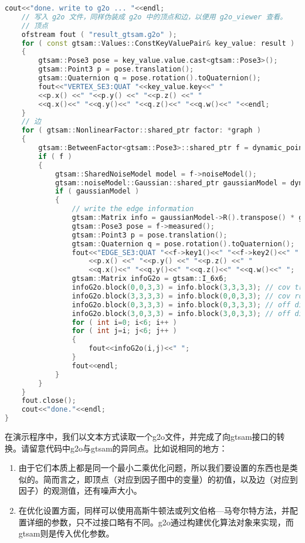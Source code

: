 \begin{lstlisting}[language=c++,caption=slambook/ch11/pose\_graph\_gtsam.cpp]
	cout<<"done. write to g2o ... "<<endl;
	// 写入 g2o 文件，同样伪装成 g2o 中的顶点和边，以便用 g2o_viewer 查看。
	// 顶点
	ofstream fout ( "result_gtsam.g2o" );
	for ( const gtsam::Values::ConstKeyValuePair& key_value: result )
	{
		gtsam::Pose3 pose = key_value.value.cast<gtsam::Pose3>();
		gtsam::Point3 p = pose.translation();
		gtsam::Quaternion q = pose.rotation().toQuaternion();
		fout<<"VERTEX_SE3:QUAT "<<key_value.key<<" "
		<<p.x() <<" "<<p.y() <<" "<<p.z() <<" "
		<<q.x()<<" "<<q.y()<<" "<<q.z()<<" "<<q.w()<<" "<<endl;
	}
	// 边 
	for ( gtsam::NonlinearFactor::shared_ptr factor: *graph )
	{
		gtsam::BetweenFactor<gtsam::Pose3>::shared_ptr f = dynamic_pointer_cast<gtsam::BetweenFactor<gtsam::Pose3>>( factor );
		if ( f )
		{
			gtsam::SharedNoiseModel model = f->noiseModel();
			gtsam::noiseModel::Gaussian::shared_ptr gaussianModel = dynamic_pointer_cast<gtsam::noiseModel::Gaussian>( model );
			if ( gaussianModel )
			{
				// write the edge information 
				gtsam::Matrix info = gaussianModel->R().transpose() * gaussianModel->R();
				gtsam::Pose3 pose = f->measured();
				gtsam::Point3 p = pose.translation();
				gtsam::Quaternion q = pose.rotation().toQuaternion();
				fout<<"EDGE_SE3:QUAT "<<f->key1()<<" "<<f->key2()<<" "
					<<p.x() <<" "<<p.y() <<" "<<p.z() <<" "
					<<q.x()<<" "<<q.y()<<" "<<q.z()<<" "<<q.w()<<" ";
				gtsam::Matrix infoG2o = gtsam::I_6x6;
				infoG2o.block(0,0,3,3) = info.block(3,3,3,3); // cov translation
				infoG2o.block(3,3,3,3) = info.block(0,0,3,3); // cov rotation
				infoG2o.block(0,3,3,3) = info.block(0,3,3,3); // off diagonal
				infoG2o.block(3,0,3,3) = info.block(3,0,3,3); // off diagonal
				for ( int i=0; i<6; i++ )
				for ( int j=i; j<6; j++ )
				{
					fout<<infoG2o(i,j)<<" ";
				}
				fout<<endl;
			}
		}
	}
	fout.close();
	cout<<"done."<<endl;
}
\end{lstlisting}

在演示程序中，我们以文本方式读取一个g2o文件，并完成了向gtsam接口的转换。请留意代码中g2o与gtsam的异同点。比如说相同的地方：

\begin{enumerate}
	\item 由于它们本质上都是同一个最小二乘优化问题，所以我们要设置的东西也是类似的。简而言之，即顶点（对应到因子图中的变量）的初值，以及边（对应到因子）的观测值，还有噪声大小。
	\item 在优化设置方面，同样可以使用高斯牛顿法或列文伯格—马夸尔特方法，并配置详细的参数，只不过接口略有不同。g2o通过构建优化算法对象来实现，而gtsam则是传入优化参数。
\end{enumerate}

